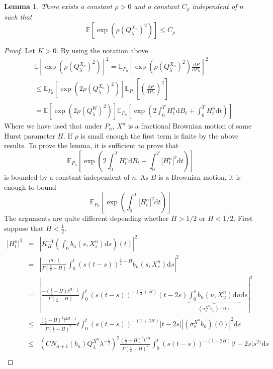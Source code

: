 \documentclass[11pt,a4paper,draft,reqno]{amsart}
\newtheorem{lemma}{Lemma}
\theoremstyle{definition}
\newcommand{\expect}{\mathbb{E}}
\newcommand{\dd}{\mathrm{d}}
\begin{document}
\begin{lemma}\label{majoration Qn}
There exists a constant $\rho >0$ and a constant $C_\rho$ independent of $n$ such that
$$\expect\left[\exp\left(\rho(Q^{X_n}_\lambda)^2\right)\right]\le C_\rho$$
\end{lemma}
\begin{proof}
Let $K>0$. 
By using the notation above
\begin{equation*}
\begin{split} 
&
\expect\left[\exp\left(\rho(Q^{X_n}_\lambda)^2\right)\right] ^2 =\expect_{P_n}\left[\exp\left(\rho(Q^{X_n}_\lambda)^2\right)\frac{\dd P}{\dd P_n}\right] ^2
\\ & \le 
\expect_{P_n}\left[\exp\left(2\rho(Q^{X_n}_\lambda)^2\right)\right] 
\expect_{P_n}\left[\left(\frac{\dd P}{\dd P_n}\right)^2\right] 
\\ & =
\expect\left[\exp\left(2\rho(Q^{W}_\lambda)^2\right)\right] 
	\expect_{P_n}\left[\exp\left(2\int_0^TH^n_t\dd B_t + \int_0^TH^n_t\dd t \right)\right]
\end{split}
\end{equation*}
Where we have used that under $P_n$, $X^n$ is a fractional Brownian motion of same Hurst parameter $H$. If $\rho$ is small enough the first term is finite by the above results. 
 To prove the lemma, it is sufficient to prove that 
$$\expect_{P_n}\left[\exp\left(2\int_0^TH^n_t\dd B_t + \int_0^T\left|H^n_t\right|^2\dd t \right)\right]$$
is bounded by a constant independent of $n$. As $B$ is a Brownian motion, it is enough to bound 
$$\expect_{P_n}\left[\exp\left(\int_0^{T}\left|H_t^n\right|^{2}\dd t\right)\right]$$
The arguments are quite different depending whether $H>1/2$ or $H<1/2$.
First suppose that $H<\frac12$.
\begin{eqnarray*}
|H_t^n|^2
&=&
\left|K_H^{-1}\left(\int_0^. b_n(s,X^n_s)\dd s\right)(t)\right|^2\\
&=&
\left|\frac{t^{H-\frac12}}{\Gamma(\frac12 - H)}\int_0^t (s(t-s))^{\frac12-H}b_n(s,X^n_s)\dd s\right|^2\\
&=&
\left|\frac{-\left(\frac12-H\right)t^{H-\frac12}}{\Gamma(\frac12 - H)}\int_0^t (s(t-s))^{-(\frac12+H)}(t-2s)\underbrace{\int_0^sb_n(u,X^n_u)\dd u}_{\left(\sigma_s^{X^n}b_n\right)(0)}\dd s\right|^2\\
&\le&
\frac{\left(\frac12-H\right)^2t^{2H-1}}{\Gamma(\frac12 - H)^2}t\int_0^t(s(t-s))^{-(1+2H)}\left|t-2s\right|\left|\left(\sigma_s^{X^n}b_n\right)(0)\right|^2\dd s\\
&\le&
\left(CN_{\alpha+1}(b_n)Q_\lambda^{X^n}\lambda^{-\frac12}\right)^2\frac{\left(\frac12-H\right)^2t^{2H}}{\Gamma(\frac12 - H)^2}\int_0^t(s(t-s))^{-(1+2H)}\left|t-2s\right|s^{2\gamma}\dd s\\

\end{eqnarray*}
\end{proof}
\end{document}
